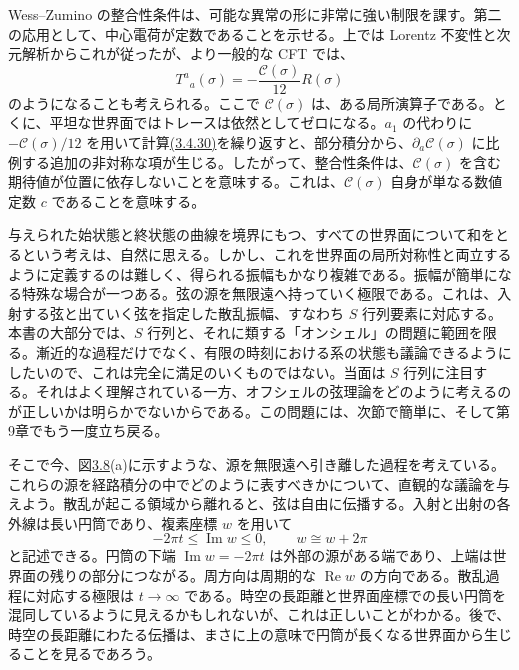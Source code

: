 Wess--Zumino の整合性条件は、可能な異常の形に非常に強い制限を課す。第二の応用として、中心電荷が定数であることを示せる。上では Lorentz 不変性と次元解析からこれが従ったが、より一般的な CFT では、
\begin{equation}
T^a{}_a(\sigma)=-\frac{\mathcal C(\sigma)}{12}R(\sigma)
\tag{3.4.31}\label{eq:3.4.31}
\end{equation}
のようになることも考えられる。ここで $\mathcal C(\sigma)$ は、ある局所演算子である。とくに、平坦な世界面ではトレースは依然としてゼロになる。$a_1$ の代わりに $-\mathcal C(\sigma)/12$ を用いて計算\hyperref[eq:3.4.30]{(3.4.30)}を繰り返すと、部分積分から、$\partial_a\mathcal C(\sigma)$ に比例する追加の非対称な項が生じる。したがって、整合性条件は、$\mathcal C(\sigma)$ を含む期待値が位置に依存しないことを意味する。これは、$\mathcal C(\sigma)$ 自身が単なる数値定数 $c$ であることを意味する。

\label{sec:3.5}

与えられた始状態と終状態の曲線を境界にもつ、すべての世界面について和をとるという考えは、自然に思える。しかし、これを世界面の局所対称性と両立するように定義するのは難しく、得られる振幅もかなり複雑である。振幅が簡単になる特殊な場合が一つある。弦の源を無限遠へ持っていく極限である。これは、入射する弦と出ていく弦を指定した散乱振幅、すなわち $S$ 行列要素に対応する。本書の大部分では、$S$ 行列と、それに類する「オンシェル」の問題に範囲を限る。漸近的な過程だけでなく、有限の時刻における系の状態も議論できるようにしたいので、これは完全に満足のいくものではない。当面は $S$ 行列に注目する。それはよく理解されている一方、オフシェルの弦理論をどのように考えるのが正しいかは明らかでないからである。この問題には、次節で簡単に、そして第9章でもう一度立ち戻る。

そこで今、図\hyperref[fig:3.8]{3.8}(a)に示すような、源を無限遠へ引き離した過程を考えている。これらの源を経路積分の中でどのように表すべきかについて、直観的な議論を与えよう。散乱が起こる領域から離れると、弦は自由に伝播する。入射と出射の各外線は長い円筒であり、複素座標 $w$ を用いて
\begin{equation}
-2\pi t\leq\operatorname{Im}w\leq0,\qquad
w\cong w+2\pi
\tag{3.5.1}\label{eq:3.5.1}
\end{equation}
と記述できる。円筒の下端 $\operatorname{Im}w=-2\pi t$ は外部の源がある端であり、上端は世界面の残りの部分につながる。周方向は周期的な $\operatorname{Re}w$ の方向である。散乱過程に対応する極限は $t\to\infty$ である。時空の長距離と世界面座標での長い円筒を混同しているように見えるかもしれないが、これは正しいことがわかる。後で、時空の長距離にわたる伝播は、まさに上の意味で円筒が長くなる世界面から生じることを見るであろう。

